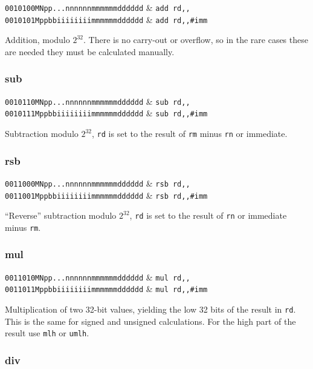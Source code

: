 \decfmt
\texttt{0010100MNpp...nnnnnnmmmmmmdddddd} & \texttt{add rd,,} \\
\texttt{0010101Mppbbiiiiiiiimmmmmmdddddd} & \texttt{add rd,,\#imm}
\finfmt

Addition, modulo $2^{32}$. There is no carry-out or overflow, so in the rare cases these are needed they must be calculated manually.

\subsubsection{sub}

\decfmt
\texttt{0010110MNpp...nnnnnnmmmmmmdddddd} & \texttt{sub rd,,} \\
\texttt{0010111Mppbbiiiiiiiimmmmmmdddddd} & \texttt{sub rd,,\#imm}
\finfmt

Subtraction modulo $2^{32}$, \texttt{rd} is set to the result of \texttt{rm} minus \texttt{rn} or immediate.

\subsubsection{rsb}

\decfmt
\texttt{0011000MNpp...nnnnnnmmmmmmdddddd} & \texttt{rsb rd,,} \\
\texttt{0011001Mppbbiiiiiiiimmmmmmdddddd} & \texttt{rsb rd,,\#imm}
\finfmt

``Reverse'' subtraction modulo $2^{32}$, \texttt{rd} is set to the result of \texttt{rn} or immediate minus \texttt{rm}.

\subsubsection{mul}

\decfmt
\texttt{0011010MNpp...nnnnnnmmmmmmdddddd} & \texttt{mul rd,,} \\
\texttt{0011011Mppbbiiiiiiiimmmmmmdddddd} & \texttt{mul rd,,\#imm}
\finfmt

Multiplication of two 32-bit values, yielding the low 32 bits of the result in \texttt{rd}. This is the same for signed and unsigned calculations. For the high part of the result use \texttt{mlh} or \texttt{umlh}.

\subsubsection{div}

